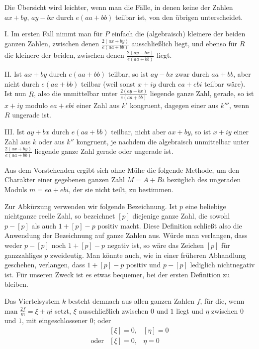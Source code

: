 Die Übersicht wird leichter, wenn man die Fälle, in denen keine der Zahlen $ax+by$, $ay-bx$ durch $e(aa+bb)$ teilbar ist, von den übrigen unterscheidet.

I. Im ersten Fall nimmt man für $P$ einfach die (algebraisch) kleinere der beiden ganzen Zahlen, zwischen denen $\frac{2(ax+by)}{e(aa+bb)}$ ausschließlich liegt, und ebenso für $R$ die kleinere der beiden, zwischen denen $\frac{2(ay-bx)}{e(aa+bb)}$ liegt.

II. Ist $ax+by$ durch $e(aa+bb)$ teilbar, so ist $ay-bx$ zwar durch $aa+bb$, aber nicht durch $e(aa+bb)$ teilbar (weil sonst $x+iy$ durch $ea+ebi$ teilbar wäre). Ist nun $R$, also die unmittelbar unter $\frac{2(ay-bx)}{e(aa+bb)}$ liegende ganze Zahl, gerade, so ist $x+iy$ modulo $ea+ebi$ einer Zahl aus $k'$ kongruent, dagegen einer aus $k'''$, wenn $R$ ungerade ist.

III. Ist $ay+bx$ durch $e(aa+bb)$ teilbar, nicht aber $ax+by$, so ist $x+iy$ einer Zahl aus $k$ oder aus $k''$ kongruent, je nachdem die algebraisch unmittelbar unter $\frac{2(ax+by)}{e(aa+bb)}$ liegende ganze Zahl gerade oder ungerade ist.


Aus dem Vorstehenden ergibt sich ohne Mühe die folgende Methode, um den Charakter einer gegebenen ganzen Zahl $M=A+Bi$ bezüglich des ungeraden Moduls $m=ea+ebi$, der sie nicht teilt, zu bestimmen.

Zur Abkürzung verwenden wir folgende Bezeichnung. Ist $p$ eine beliebige nichtganze reelle Zahl, so bezeichnet $[p]$ diejenige ganze Zahl, die sowohl $p-[p]$ als auch $1+[p]-p$ positiv macht. Diese Definition schließt also die Anwendung der Bezeichnung auf ganze Zahlen aus. Würde man verlangen, dass weder $p-[p]$ noch $1+[p]-p$ negativ ist, so wäre das Zeichen $[p]$ für ganzzahliges $p$ zweideutig. Man könnte auch, wie in einer früheren Abhandlung geschehen, verlangen, dass $1+[p]-p$ positiv und $p-[p]$ lediglich nichtnegativ ist. Für unseren Zweck ist es etwas bequemer, bei der ersten Definition zu bleiben.

Das Viertelsystem $k$ besteht demnach aus allen ganzen Zahlen $f$, für die, wenn man $\frac{2f}{m}=\xi+\eta i$ setzt, $\xi$ ausschließlich zwischen $0$ und $1$ liegt und $\eta$ zwischen $0$ und $1$, mit eingeschlossener $0$; oder
\[
\begin{array}{lll}
&[\xi]=0,&[\eta]=0\\
\text{oder}&[\xi]=0,&\eta=0
\end{array}
\]

